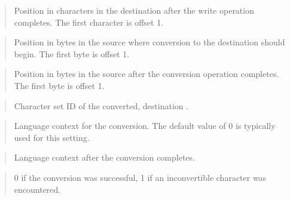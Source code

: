 \documentclass[letterpaper,10pt,english,openany,oneside]{sphinxmanual}
\begin{document}
\begin{quote}

Position in characters in the destination  after the write operation
completes. The first character is offset 1.
\end{quote}

\begin{quote}

Position in bytes in the source  where conversion to the destination
 should begin. The first byte is offset 1.
\end{quote}

\begin{quote}

Position in bytes in the source  after the conversion operation
completes. The first byte is offset 1.
\end{quote}

\begin{quote}

Character set ID of the converted, destination .
\end{quote}

\begin{quote}

Language context for the conversion. The default value of 0 is typically
used for this setting.
\end{quote}

\begin{quote}

Language context after the conversion completes.
\end{quote}

\begin{quote}

0 if the conversion was successful, 1 if an inconvertible character was
encountered.
\end{quote}

\newpage
\end{document}
